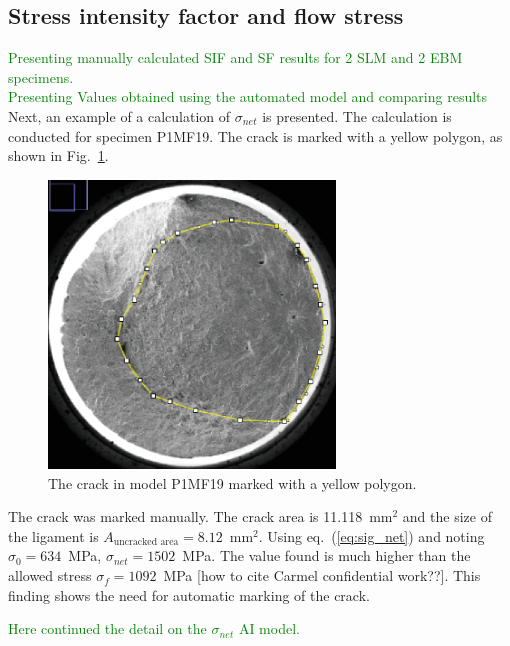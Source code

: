 \documentclass[preprint,12pt]{elsarticle}
\begin{document}
\begin{itemize}
\subsection{Stress intensity factor and flow stress}
\label{Subsec: Stress intensity factor and flow stress}
\textcolor{green}{Presenting manually calculated SIF and SF results for 2 SLM and 2 EBM specimens.\\Presenting Values obtained using the automated model and comparing results }
Next, an example of a calculation of $\sigma_{net}$ is presented.
The calculation is conducted for specimen P1MF19.
The crack is marked with a yellow polygon, as shown in Fig.~\ref{fig:P1MF19}.
%
\begin{figure}[t!]
  \begin{center}
  \includegraphics[width=3in]{P1MF19.eps}
  \caption{The crack in model P1MF19 marked with a yellow polygon.}
  \label{fig:P1MF19}
   \end{center}
\end{figure}
%
The crack was marked manually.
The crack area is 11.118~mm$^2$ and the size of the ligament is $A_{\mbox{uncracked area}}=8.12$~mm$^2$.
Using eq.~(\ref{eq:sig_net}) and noting $\sigma_0=634$~MPa,
                           $\sigma_{net}=1502$~MPa.
The value found is much higher than the allowed stress $\sigma_f=1092$~MPa [how to cite Carmel confidential work??].
This finding shows the need for automatic marking of the crack.


%
%
\textcolor{green}{Here continued the detail on the $\sigma_{net}$ AI model.}



\end{itemize}
\end{document}
